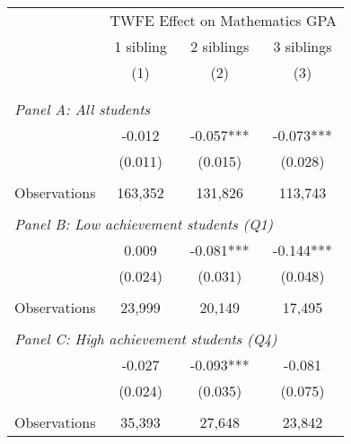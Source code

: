 \makeatletter
{}
{
\makeatother
\begin{tabular}{lccc}
\toprule
\cmidrule(lr){2-4}
& \multicolumn{3}{c}{TWFE Effect on Mathematics GPA} \\
\cmidrule(lr){2-4}
& 1 sibling & 2 siblings & 3 siblings  \\
\cmidrule(lr){2-2} \cmidrule(lr){3-3} \cmidrule(lr){4-4}
& (1) & (2) & (3)\\
\bottomrule
&  &  &  \\
&  &  &   \\
\multicolumn{4}{l}{\textit{Panel A: All students}} \\
\hspace{3mm}        &      -0.012   &      -0.057***&      -0.073***\\
                    &     (0.011)   &     (0.015)   &     (0.028)   \\
                    &               &               &               \\
\hspace{3mm}Observations&     163,352   &     131,826   &     113,743   \\
 
&  &  &   \\
\multicolumn{4}{l}{\textit{Panel B: Low achievement students (Q1)}} \\
\hspace{3mm}        &       0.009   &      -0.081***&      -0.144***\\
                    &     (0.024)   &     (0.031)   &     (0.048)   \\
                    &               &               &               \\
\hspace{3mm}Observations&      23,999   &      20,149   &      17,495   \\
 
&  &  &   \\
\multicolumn{4}{l}{\textit{Panel C: High achievement students (Q4)}} \\
\hspace{3mm}        &      -0.027   &      -0.093***&      -0.081   \\
                    &     (0.024)   &     (0.035)   &     (0.075)   \\
                    &               &               &               \\
\hspace{3mm}Observations&      35,393   &      27,648   &      23,842   \\
 

\end{tabular}}
